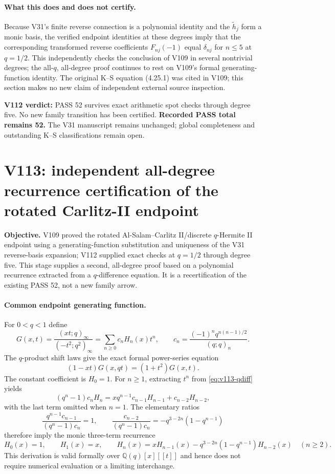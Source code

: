 \documentclass[11pt]{article}
\begin{document}
\paragraph{What this does and does not certify.}
Because V31's finite reverse connection is a polynomial identity and the $\widetilde h_j$ form a monic basis, the verified endpoint identities at these degrees imply that the corresponding transformed reverse coefficients $F_{nj}(-1)$ equal $\delta_{nj}$ for $n\le5$ at $q=1/2$. This independently checks the conclusion of V109 in several nontrivial degrees; the all-$q$, all-degree proof continues to rest on V109's formal generating-function identity. The original K--S equation (4.25.1) was cited in V109; this section makes no new claim of independent external source inspection.

\noindent\textbf{V112 verdict:} PASS 52 survives exact arithmetic spot checks through degree five. No new family transition has been certified. \textbf{Recorded PASS total remains 52.} The V31 manuscript remains unchanged; global completeness and outstanding K--S classifications remain open.



\clearpage
\section{V113: independent all-degree recurrence certification of the rotated Carlitz-II endpoint}
\noindent\textbf{Objective.} V109 proved the rotated Al-Salam--Carlitz II/discrete $q$-Hermite II endpoint using a generating-function substitution and uniqueness of the V31 reverse-basis expansion; V112 supplied exact checks at $q=1/2$ through degree five. This stage supplies a second, all-degree proof based on a polynomial recurrence extracted from a $q$-difference equation. It is a recertification of the existing PASS 52, not a new family arrow.

\paragraph{Common endpoint generating function.}
For $0<q<1$ define
\[
 G(x,t)=\frac{(xt;q)_\infty}{(-t^2;q^2)_\infty}
 =\sum_{n\ge0}c_n H_n(x)t^n,
 \qquad c_n=\frac{(-1)^nq^{n(n-1)/2}}{(q;q)_n}.
\]
The $q$-product shift laws give the exact formal power-series equation
\begin{equation}\label{eq:v113-qdiff}
 (1-xt)G(x,qt)=(1+t^2)G(x,t).
\end{equation}
The constant coefficient is $H_0=1$. For $n\ge1$, extracting $t^n$ from \eqref{eq:v113-qdiff} yields
\[
 (q^n-1)c_nH_n=xq^{n-1}c_{n-1}H_{n-1}+c_{n-2}H_{n-2},
\]
with the last term omitted when $n=1$. The elementary ratios
\[
 \frac{q^{n-1}c_{n-1}}{(q^n-1)c_n}=1,
 \qquad
 \frac{c_{n-2}}{(q^n-1)c_n}
 =-q^{3-2n}(1-q^{n-1})
\]
therefore imply the monic three-term recurrence
\begin{equation}\label{eq:v113-rec}
 H_0(x)=1,\qquad H_1(x)=x,\qquad
 H_n(x)=xH_{n-1}(x)-q^{3-2n}(1-q^{n-1})H_{n-2}(x)
 \quad(n\ge2).
\end{equation}
This derivation is valid formally over $\mathbb Q(q)[x][[t]]$ and hence does not require numerical evaluation or a limiting interchange.
\end{document}
